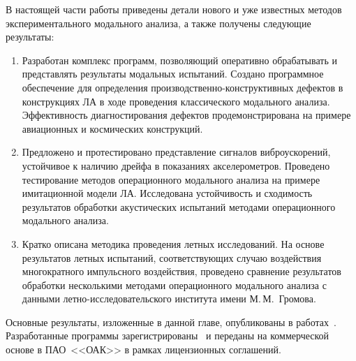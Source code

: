 В настоящей части работы приведены детали нового и уже известных методов экспериментального модального анализа, а также получены следующие результаты:
\begin{enumerate}
	\item Разработан комплекс программ, позволяющий оперативно обрабатывать и представлять результаты модальных испытаний. Создано программное обеспечение для определения производственно-конструктивных дефектов в конструкциях ЛА в ходе проведения классического модального анализа. Эффективность диагностирования дефектов продемонстрирована на примере авиационных и космических конструкций.
	\item Предложено и протестировано представление сигналов виброускорений, устойчивое к наличию дрейфа в показаниях акселерометров. Проведено тестирование методов операционного модального анализа на примере имитационной модели ЛА. Исследована устойчивость и сходимость результатов обработки акустических испытаний методами операционного модального анализа. 
	\item Кратко описана методика проведения летных исследований. На основе результатов летных испытаний, соответствующих случаю воздействия многократного импульсного воздействия, проведено сравнение результатов обработки несколькими методами операционного модального анализа с данными летно-исследовательского института имени М.\,М.~Громова.
\end{enumerate}

Основные результаты, изложенные в данной главе, опубликованы в работах~\cite{lib:author:iss2017:crackIdentification, lib:author:gorshkov:crackIdentification, lib:author:iss2018:crackIdentification, lib:author:metal:crackIdentification, lib:author:nti2019:gvt, lib:author:metal:gapsIdentification, lib:author:certificate:GenCalc, lib:author:certificate:ResponseAnalyzer, lib:author:certificate:DistortionFinder, lib:author:sibnia2021:ModalData, lib:author:sibnia2021:defects, lib:author:chinese:defects, lib:author:iss2021:defects, lib:author:flight:modalData, lib:author:flight:defects, lib:author:iss2022:oma, lib:author:certificate:FlightLab}. Разработанные программы зарегистрированы~ и переданы на коммерческой основе в ПАО~<<ОАК>> в рамках лицензионных соглашений. 